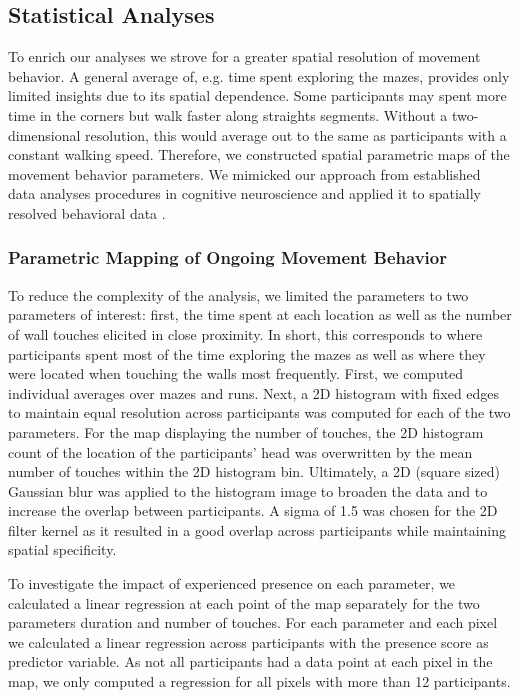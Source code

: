 \subsection{Statistical Analyses}
To enrich our analyses we strove for a greater spatial resolution of movement behavior. A general average of, e.g. time spent exploring the mazes, provides only limited insights due to its spatial dependence. Some participants may spent more time in the corners but walk faster along straights segments. Without a two-dimensional resolution, this would average out to the same as participants with a constant walking speed. Therefore, we constructed spatial parametric maps of the movement behavior parameters. We mimicked our approach from established data analyses procedures in cognitive neuroscience and applied it to spatially resolved behavioral data \cite{Friston1994, Bridwell2018a}.

\subsubsection{Parametric Mapping of Ongoing Movement Behavior}
To reduce the complexity of the analysis, we limited the parameters to two parameters of interest: first, the time spent at each location as well as the number of wall touches elicited in close proximity. In short, this corresponds to where participants spent most of the time exploring the mazes as well as where they were located when touching the walls most frequently. First, we computed individual averages over mazes and runs. Next, a 2D histogram with fixed edges to maintain equal resolution across participants was computed for each of the two parameters. For the map displaying the number of touches, the 2D histogram count of the location of the participants' head was overwritten by the mean number of touches within the 2D histogram bin. Ultimately, a 2D (square sized) Gaussian blur was applied to the histogram image to broaden the data and to increase the overlap between participants. A sigma of 1.5 was chosen for the 2D filter kernel as it resulted in a good overlap across participants while maintaining spatial specificity.

To investigate the impact of experienced presence on each parameter, we calculated a linear regression at each point of the map separately for the two parameters duration and number of touches. For each parameter and each pixel we calculated a linear regression across participants with the presence score as predictor variable. As not all participants had a data point at each pixel in the map, we only computed a regression for all pixels with more than 12 participants.

